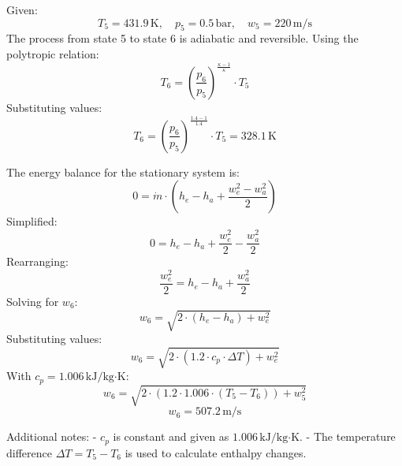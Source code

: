 Given:  
\[
T_5 = 431.9 \, \text{K}, \quad p_5 = 0.5 \, \text{bar}, \quad w_5 = 220 \, \text{m/s}
\]  
The process from state 5 to state 6 is adiabatic and reversible. Using the polytropic relation:  
\[
T_6 = \left( \frac{p_6}{p_5} \right)^{\frac{\kappa - 1}{\kappa}} \cdot T_5
\]  
Substituting values:  
\[
T_6 = \left( \frac{p_6}{p_5} \right)^{\frac{1.4 - 1}{1.4}} \cdot T_5 = 328.1 \, \text{K}
\]  

The energy balance for the stationary system is:  
\[
0 = \dot{m} \cdot \left( h_e - h_a + \frac{w_e^2 - w_a^2}{2} \right)
\]  
Simplified:  
\[
0 = h_e - h_a + \frac{w_e^2}{2} - \frac{w_a^2}{2}
\]  
Rearranging:  
\[
\frac{w_e^2}{2} = h_e - h_a + \frac{w_a^2}{2}
\]  
Solving for \( w_6 \):  
\[
w_6 = \sqrt{2 \cdot (h_e - h_a) + w_e^2}
\]  
Substituting values:  
\[
w_6 = \sqrt{2 \cdot (1.2 \cdot c_p \cdot \Delta T) + w_e^2}
\]  
With \( c_p = 1.006 \, \text{kJ}/\text{kg·K} \):  
\[
w_6 = \sqrt{2 \cdot (1.2 \cdot 1.006 \cdot (T_5 - T_6)) + w_5^2}
\]  
\[
w_6 = 507.2 \, \text{m/s}
\]  

Additional notes:  
- \( c_p \) is constant and given as \( 1.006 \, \text{kJ}/\text{kg·K} \).  
- The temperature difference \( \Delta T = T_5 - T_6 \) is used to calculate enthalpy changes.